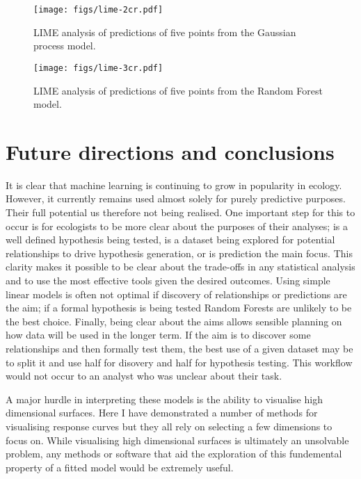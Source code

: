 \documentclass[10pt,]{article}
\begin{document}
\begin{figure}[t!]
\centering
\texttt{[image: figs/lime-2cr.pdf]}
\caption{LIME analysis of predictions of five points from the Gaussian process model.\protect\label{fig:limegp}}
\end{figure}

\begin{figure}[t!]
\centering
\texttt{[image: figs/lime-3cr.pdf]}
\caption{LIME analysis of predictions of five points from the Random Forest model.\protect\label{fig:limerf}}
\end{figure}

\section{Future directions and conclusions}\label{future-directions-and-conclusions}

It is clear that machine learning is continuing to grow in popularity in ecology.
However, it currently remains used almost solely for purely predictive purposes.
Their full potential us therefore not being realised.
One important step for this to occur is for ecologists to be more clear about the purposes of their analyses; is a well defined hypothesis being tested, is a dataset being explored for potential relationships to drive hypothesis generation, or is prediction the main focus.
This clarity makes it possible to be clear about the trade-offs in any statistical analysis and to use the most effective tools given the desired outcomes.
Using simple linear models is often not optimal if discovery of relationships or predictions are the aim; if a formal hypothesis is being tested Random Forests are unlikely to be the best choice.
Finally, being clear about the aims allows sensible planning on how data will be used in the longer term.
If the aim is to discover some relationships and then formally test them, the best use of a given dataset may be to split it and use half for disovery and half for hypothesis testing.
This workflow would not occur to an analyst who was unclear about their task.

A major hurdle in interpreting these models is the ability to visualise high dimensional surfaces.
Here I have demonstrated a number of methods for visualising response curves but they all rely on selecting a few dimensions to focus on.
While visualising high dimensional surfaces is ultimately an unsolvable problem, any methods or software that aid the exploration of this fundemental property of a fitted model would be extremely useful.
\end{document}
